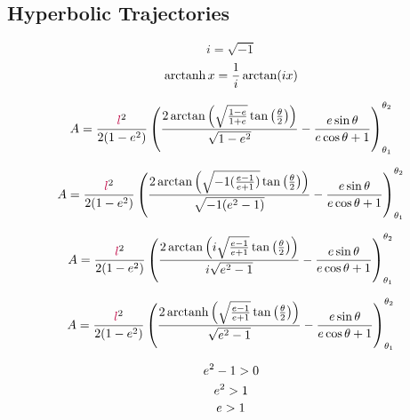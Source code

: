 \subsection{Hyperbolic Trajectories}
$$i=\sqrt{-1}$$
$$\operatorname{arctanh}{x}=\frac{1}{i}\arctan(ix)$$

$$A=\frac{\textcolor{purple}{l}^2}{2(1-\textcolor{black}{e}^2)} \left(
\frac{2\arctan\left(\sqrt{\frac{1-\textcolor{black}{e}}{1+\textcolor{black}{e}}}\tan{\left(\frac{\theta}{2}\right)}\right)}{\sqrt{1-\textcolor{black}{e}^2}}
-\frac{\textcolor{black}{e}\sin{\theta}}{\textcolor{black}{e}\cos{\theta}+1}\right)_{\theta_1}^{\theta_2}$$

$$A=\frac{\textcolor{purple}{l}^2}{2(1-\textcolor{black}{e}^2)} \left(
\frac{2\arctan\left(\sqrt{-1(\frac{\textcolor{black}{e}-1}{\textcolor{black}{e}+1})}\tan{\left(\frac{\theta}{2}\right)}\right)}{\sqrt{-1(\textcolor{black}{e}^2-1)}}
-\frac{\textcolor{black}{e}\sin{\theta}}{\textcolor{black}{e}\cos{\theta}+1}\right)_{\theta_1}^{\theta_2}$$

$$A=\frac{\textcolor{purple}{l}^2}{2(1-\textcolor{black}{e}^2)} \left(
\frac{2\arctan\left(i\sqrt{\frac{\textcolor{black}{e}-1}{\textcolor{black}{e}+1}}\tan{\left(\frac{\theta}{2}\right)}\right)}{i\sqrt{\textcolor{black}{e}^2-1}}
-\frac{\textcolor{black}{e}\sin{\theta}}{\textcolor{black}{e}\cos{\theta}+1}\right)_{\theta_1}^{\theta_2}$$

$$A=\frac{\textcolor{purple}{l}^2}{2(1-\textcolor{black}{e}^2)} \left(
\frac{2\operatorname{arctanh}\left(\sqrt{\frac{\textcolor{black}{e}-1}{\textcolor{black}{e}+1}}\tan{\left(\frac{\theta}{2}\right)}\right)}{\sqrt{\textcolor{black}{e}^2-1}}
-\frac{\textcolor{black}{e}\sin{\theta}}{\textcolor{black}{e}\cos{\theta}+1}\right)_{\theta_1}^{\theta_2}$$

$$\textcolor{black}{e}^2-1>0$$
$$\textcolor{black}{e}^2>1$$
$$\textcolor{black}{e}>1$$